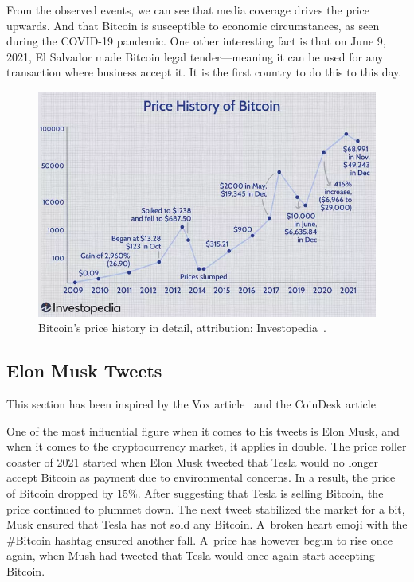 From the observed events, we can see that media coverage drives the price upwards. And that Bitcoin is susceptible to economic circumstances, as seen during the COVID-19 pandemic. One other interesting fact is that on June 9, 2021, El Salvador made Bitcoin legal tender---meaning it can be used for any transaction where business accept it. It is the first country to do this to this day.

\begin{figure}[!hbt]
    \centering
    \includegraphics[width=\columnwidth]{figures/investopedia-bitcoin-price-history.png}
    \caption{Bitcoin's price history in detail, attribution: Investopedia~\cite{investopedia:bitcoin-price-history}.}
    \label{figure-investopedia-btc-history}
\end{figure}

\subsection*{Elon Musk Tweets}
This section has been inspired by the Vox article~\cite{vox:elon} and the CoinDesk article~\cite{coindesk:elon}

One of the most influential figure when it comes to his tweets is Elon Musk, and when it comes to the cryptocurrency market, it applies in double. The price roller coaster of 2021 started when Elon Musk tweeted that Tesla would no longer accept Bitcoin as payment due to environmental concerns. In a result, the price of Bitcoin dropped by 15\%. After suggesting that Tesla is selling Bitcoin, the price continued to plummet down. The next tweet stabilized the market for a bit, Musk ensured that Tesla has not sold any Bitcoin. A~broken heart emoji with the \#Bitcoin hashtag ensured another fall. A~price has however begun to rise once again, when Mush had tweeted that Tesla would once again start accepting Bitcoin.

